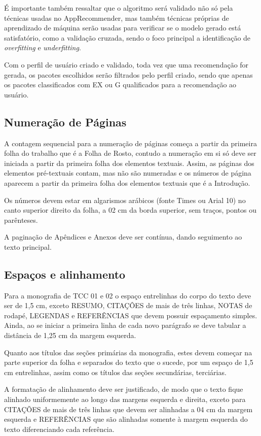 É importante também ressaltar que o algoritmo será validado não só pela técnicas usadas no AppRecommender, mas também técnicas próprias de
aprendizado de máquina serão usadas para verificar se o modelo gerado está satisfatório, como a validação cruzada, sendo o foco principal a
identificação de \textit{overfitting} e \textit{underfitting}.

Com o perfil de usuário criado e validado, toda vez que uma recomendação for gerada, os pacotes escolhidos serão filtrados pelo perfil criado,
sendo que apenas os pacotes classificados com EX ou G qualificados para a recomendação ao usuário.
        

\subsection{Numeração de Páginas}

A contagem sequencial para a numeração de páginas começa a partir da 
primeira folha do trabalho que é a Folha de Rosto, contudo a numeração em 
si só deve ser iniciada a partir da primeira folha dos elementos textuais. 
Assim, as páginas dos elementos pré-textuais contam, mas não são numeradas 
e os números de página aparecem a partir da primeira folha dos elementos 
textuais que é a Introdução. 

Os números devem estar em algarismos arábicos (fonte Times ou Arial 10) no 
canto superior direito da folha, a 02 cm da borda superior, sem traços, 
pontos ou parênteses. 

A paginação de Apêndices e Anexos deve ser contínua, dando seguimento ao 
texto principal.

\subsection{Espaços e alinhamento}

Para a monografia de TCC 01 e 02 o espaço entrelinhas do corpo do texto 
deve ser de 1,5 cm, exceto RESUMO, CITAÇÔES de mais de três linhas, NOTAS 
de rodapé, LEGENDAS e REFERÊNCIAS que devem possuir espaçamento simples. 
Ainda, ao se iniciar a primeira linha de cada novo parágrafo se deve 
tabular a distância de 1,25 cm da margem esquerda.

Quanto aos títulos das seções primárias da monografia, estes devem começar 
na parte superior da folha e separados do texto que o sucede, por um espaço 
de 1,5 cm entrelinhas, assim como os títulos das seções secundárias, 
terciárias. 

A formatação de alinhamento deve ser justificado, de modo que o texto fique 
alinhado uniformemente ao longo das margens esquerda e direita, exceto para 
CITAÇÕES de mais de três linhas que devem ser alinhadas a 04 cm da margem 
esquerda e REFERÊNCIAS que são alinhadas somente à margem esquerda do texto 
diferenciando cada referência.

